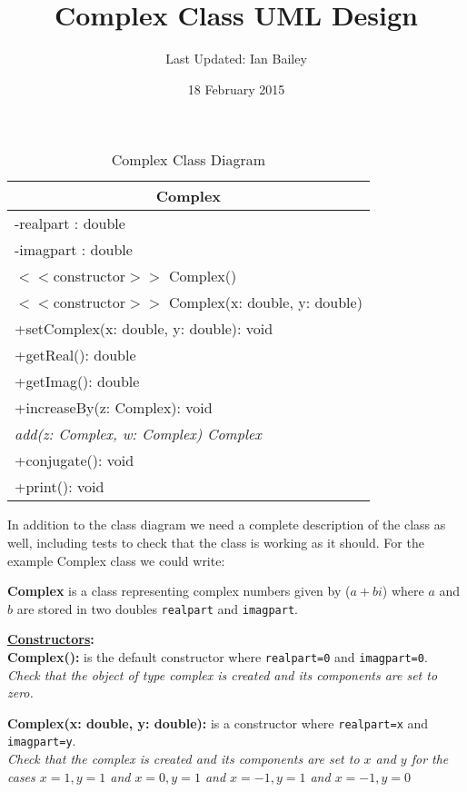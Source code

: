 \documentclass[11pt,a4paper]{article}
\begin{document}
\title{\textbf{Complex Class UML Design}}
\author{Last Updated: Ian Bailey}
\date{18 February 2015}
\maketitle

\begin{table}[h]
  \centering
  \begin{tabular}{|l|}
    \hline
    \multicolumn{1}{|c|}{\bf Complex} \\
    \hline
    -realpart : double \\
    -imagpart : double \\
    \hline
    $<<$constructor$>>$ Complex()\\
    $<<$constructor$>>$ Complex(x: double, y: double)\\
    +setComplex(x: double, y: double): void\\
    +getReal(): double\\
    +getImag(): double\\
    +increaseBy(z: Complex): void\\
    \emph{add(z: Complex, w: Complex) Complex }\\
    +conjugate(): void\\    
    +print(): void\\
    \hline
  \end{tabular}
  \caption{Complex Class Diagram}
  \label{tab:complex_design}
\end{table}

In addition to the class diagram we need a complete description of the
class as well, including tests to check that the class is working as
it should. For the example Complex class we could write:

{\bf Complex} is a class representing complex numbers given by ($a +
bi$) where $a$ and $b$ are stored in two doubles \texttt{realpart} and
\texttt{imagpart}.

{\bf \underline{Constructors}:}\\
{\bf Complex():} is the default constructor where \texttt{realpart=0} and
\texttt{imagpart=0}. \\
{\it Check that the object of type complex is created and its components are set to zero.}

{\bf Complex(x: double, y: double):} is a constructor where
\texttt{realpart=x} and \texttt{imagpart=y}. \\
{\it Check that the complex is created and its components are set to $x$ and $y$ for the cases $x=1, y=1$ and $x=0, y=1$ and $x=-1, y=1$ and $x=-1, y=0$}
\end{document}
